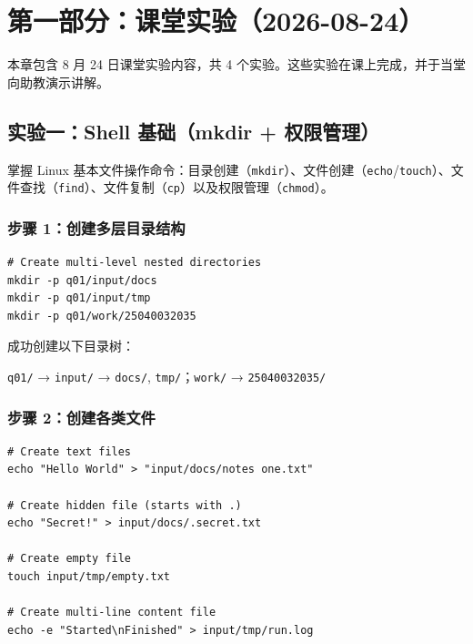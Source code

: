 \documentclass[12pt,a4paper]{article}
\begin{document}
\newpage
\section*{第一部分：课堂实验（2026-08-24）}

本章包含 8 月 24 日课堂实验内容，共 4 个实验。这些实验在课上完成，并于当堂向助教演示讲解。

\subsection{实验一：Shell 基础（mkdir + 权限管理）}

\begin{goalbox}
掌握 Linux 基本文件操作命令：目录创建（\texttt{mkdir}）、文件创建（\texttt{echo}/\texttt{touch}）、文件查找（\texttt{find}）、文件复制（\texttt{cp}）以及权限管理（\texttt{chmod}）。
\end{goalbox}

\subsubsection{步骤 1：创建多层目录结构}

\begin{lstlisting}[style=shellstyle, caption={Create project directory structure}]
# Create multi-level nested directories
mkdir -p q01/input/docs
mkdir -p q01/input/tmp
mkdir -p q01/work/25040032035
\end{lstlisting}

\begin{resultbox}
成功创建以下目录树：

\texttt{q01/} → \texttt{input/} → \texttt{docs/}, \texttt{tmp/}；\texttt{work/} → \texttt{25040032035/}
\end{resultbox}

\subsubsection{步骤 2：创建各类文件}

\begin{lstlisting}[style=shellstyle, caption={Create various files}]
# Create text files
echo "Hello World" > "input/docs/notes one.txt"

# Create hidden file (starts with .)
echo "Secret!" > input/docs/.secret.txt

# Create empty file
touch input/tmp/empty.txt

# Create multi-line content file
echo -e "Started\nFinished" > input/tmp/run.log
\end{lstlisting}
\end{document}
